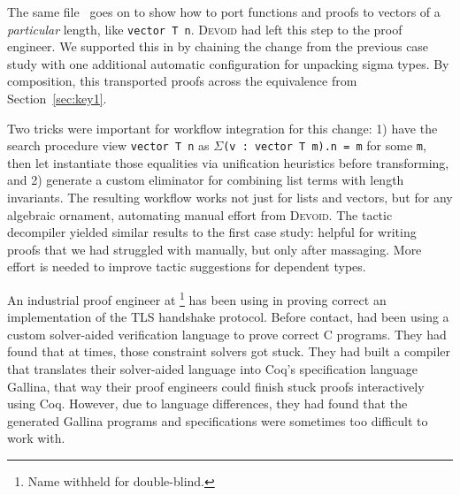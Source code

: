 The same file~ goes on to show how to port functions and proofs to vectors of a \textit{particular} length, 
like \lstinline{vector T n}.
\textsc{Devoid} had left this step to the proof engineer.
We supported this in \toolname by chaining the change from the previous case study
with one additional automatic configuration for unpacking sigma types.
By composition, this transported proofs across the equivalence from Section~\ref{sec:key1}.

Two tricks were important for workflow integration for this change:
1) have the search procedure view \lstinline{vector T n} as 
$\Sigma$\lstinline{(v : vector T m).n = m} for some \lstinline{m},
then let \toolname instantiate those equalities via unification heuristics before transforming,
and 2) generate a custom eliminator for combining
list terms with length invariants.
The resulting workflow works not just for lists and vectors, but for any algebraic ornament,
automating manual effort from \textsc{Devoid}.
The tactic decompiler yielded similar results to the first case study: helpful for writing proofs
that we had struggled with manually, but only after massaging.
More effort is needed to improve tactic suggestions for dependent types.

An industrial proof engineer at \company\footnote{Name withheld for double-blind.} has been using \toolname in proving
correct an implementation of the TLS handshake protocol.
Before contact, \company had been using a custom solver-aided verification language to prove correct C programs.
They had found that at times, those constraint solvers got stuck.
They had built a compiler that translates their solver-aided language into Coq's specification language Gallina,
that way their proof engineers could finish stuck proofs interactively using Coq.
However, due to language differences, they had found that the generated Gallina programs and specifications were sometimes too difficult to work with.

